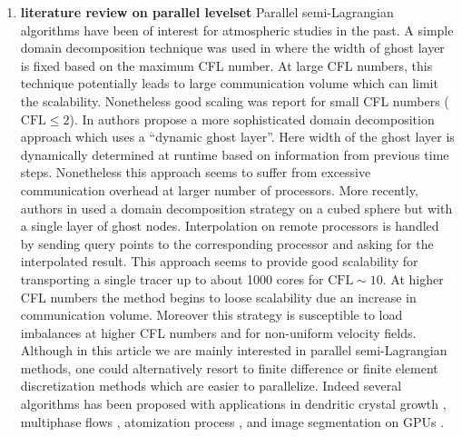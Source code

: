 \begin{enumerate}
\item \textbf{literature review on parallel levelset}
Parallel semi-Lagrangian algorithms have been of interest for atmospheric studies in the past. A simple domain decomposition technique was used in \cite{Thomas;Cote:95:Massively-parallel-s} where the width of ghost layer is fixed based on the maximum CFL number. At large CFL numbers, this technique potentially leads to large communication volume which can limit the scalability. Nonetheless good scaling was report for small CFL numbers ($\text{CFL} \le 2$). In \cite{Drake;Foster;Michalakes;etal:95:Design-and-performan} authors propose a more sophisticated domain decomposition approach which uses a ``dynamic ghost layer''. Here width of the ghost layer is dynamically determined at runtime based on information from previous time steps. Nonetheless this approach seems to suffer from excessive communication overhead at larger number of processors. More recently, authors in \cite{White-III;Dongarra:11:High-performance-hig} used a domain decomposition strategy on a cubed sphere but with a single layer of ghost nodes. Interpolation on remote processors is handled by sending query points to the corresponding processor and asking for the interpolated result. This approach seems to provide good scalability for transporting a single tracer up to about 1000 cores for $\text{CFL} \sim 10$. At higher CFL numbers the method begins to loose scalability due an increase in communication volume. Moreover this strategy is susceptible to load imbalances at higher CFL numbers and for non-uniform velocity fields. Although in this article we are mainly interested in parallel semi-Lagrangian methods, one could alternatively resort to finite difference or finite element discretization methods which are easier to parallelize. Indeed several algorithms has been proposed with applications in dendritic crystal growth \cite{Wang;Chang;Kale;etal:06:Parallelization-of-a}, multiphase flows \cite{Sussman:05:A-parallelized-adapt, Fortmeier;Bucker:11:A-parallel-strategy-, Rodriguez;Sahni;Lahey-Jr;etal:13:A-parallel-adaptive-}, atomization process \cite{Herrmann:10:A-parallel-Eulerian-}, and image segmentation on GPUs \cite{Lefohn;Cates;Whitaker:03:Interactive-GPU-base,Cates;Lefohn;Whitaker:04:GIST:-an-interactive,Roberts;Packer;Sousa;etal:10:A-work-efficient-GPU}.


\end{enumerate}
